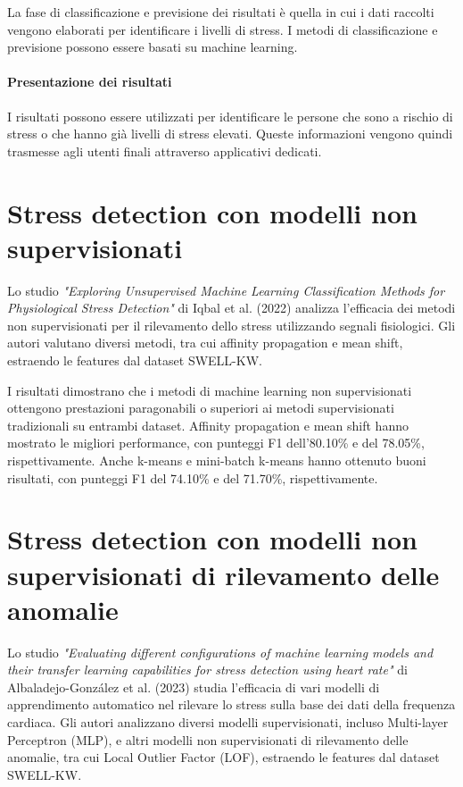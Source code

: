 La fase di classificazione e previsione dei risultati è quella in cui i dati raccolti vengono elaborati per identificare i livelli di stress. I metodi di classificazione e previsione possono essere basati su machine learning.

\paragraph{Presentazione dei risultati}

I risultati possono essere utilizzati per identificare le persone che sono a rischio di stress o che hanno già livelli di stress elevati. Queste informazioni vengono quindi trasmesse agli utenti finali attraverso applicativi dedicati.

\section{Stress detection con modelli non supervisionati}

Lo studio \textit{"Exploring Unsupervised Machine Learning Classification Methods for Physiological Stress Detection"} di Iqbal et al. (2022) \cite{iqbal2022exploring} analizza l'efficacia dei metodi non supervisionati per il rilevamento dello stress utilizzando segnali fisiologici. Gli autori valutano diversi metodi, tra cui affinity propagation e mean shift, estraendo le features dal dataset SWELL-KW.

\bigskip

I risultati dimostrano che i metodi di machine learning non supervisionati ottengono prestazioni paragonabili o superiori ai metodi supervisionati tradizionali su entrambi dataset. Affinity propagation e mean shift hanno mostrato le migliori performance, con punteggi F1 dell'80.10\% e del 78.05\%, rispettivamente. Anche k-means e mini-batch k-means hanno ottenuto buoni risultati, con punteggi F1 del 74.10\% e del 71.70\%, rispettivamente.

\section{Stress detection con modelli non supervisionati di rilevamento delle anomalie}

Lo studio \textit{"Evaluating different configurations of machine learning models and their transfer learning capabilities for stress detection using heart rate"} di Albaladejo-González et al. (2023) \cite{albaladejo2023evaluating} studia l'efficacia di vari modelli di apprendimento automatico nel rilevare lo stress sulla base dei dati della frequenza cardiaca. Gli autori analizzano diversi modelli supervisionati, incluso Multi-layer Perceptron (MLP), e altri modelli non supervisionati di rilevamento delle anomalie, tra cui Local Outlier Factor (LOF), estraendo le features dal dataset SWELL-KW.


